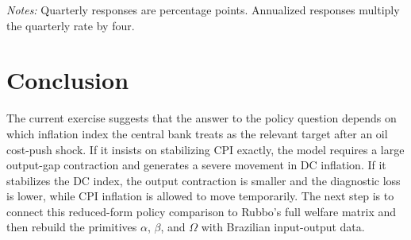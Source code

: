 \documentclass[12pt]{article}
\begin{document}
\begin{table}[htbp]
    \centering
    \caption{Interest-rate responses under alternative monetary-policy rules}
    \label{tab:rate_policy_rules}
    \begin{flushleft}
        \footnotesize
        \textit{Notes:} Quarterly responses are percentage points. Annualized
        responses multiply the quarterly rate by four.
    \end{flushleft}
\end{table}

\section{Conclusion}
\label{sec:conclusion}

The current exercise suggests that the answer to the policy question depends on which
inflation index the central bank treats as the relevant target after an oil cost-push
shock. If it insists on stabilizing CPI exactly, the model requires a large output-gap
contraction and generates a severe movement in DC inflation. If it stabilizes the DC
index, the output contraction is smaller and the diagnostic loss is lower, while CPI
inflation is allowed to move temporarily. The next step is to connect this reduced-form
policy comparison to Rubbo's full welfare matrix and then rebuild the primitives
$\alpha$, $\beta$, and $\Omega$ with Brazilian input-output data.

\clearpage
\singlespacing



\clearpage
\onehalfspacing
\appendix
\end{document}
